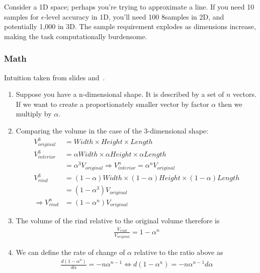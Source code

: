 \documentclass[11pt]{article}
\begin{document}
Consider a 1D space; perhaps you're trying to approximate a line. If you need 10 samples for $\epsilon$-level accuracy in 1D, you'll need 100 8samples in 2D, and potentially 1,000 in 3D. The sample requirement explodes as dimensions increase, making the task computationally burdensome.

\subsubsection{Math}

Intuition taken from slides and~\cite{stackexchangeMathematicalDemonstration}.

\begin{enumerate}
    \item Suppose you have a n-dimensional shape. It is described by a set of $n$ vectors. If we want to create a proportionately smaller vector by factor $\alpha$ then we multiply by $\alpha$.
    \item Comparing the volume in the case of the 3-dimensional shape:
          \begin{align}
              V^3_{original} & =Width\times Height\times Length                                                                     \\
              V^3_{interior} & =\alpha Width\times \alpha Height\times \alpha Length                                                \\
                             & = \alpha^3 V_{original} \Rightarrow V^n_{interior} = \alpha^n V_{original}                           \\
              V^3_{rind}     & = (1-\alpha) Width\times (1-\alpha) Height\times (1-\alpha) Length\label{equ:rind-vs-interror-alpha} \\
                             & = (1-\alpha^3) V_{original}  \\ 
              \Rightarrow V^n_{rind}  & = (1-\alpha^n) V_{original}
          \end{align}
    \item The volume of the rind relative to the original volume therefore is
          \begin{align}
              \frac{V_{rind}}{V_{original}} = 1 - \alpha^n
          \end{align}
    \item We can define the rate of change of $\alpha$ relative to the ratio above as
          \begin{align}
              \frac{d (1 - \alpha^n)}{d\alpha} = -n\alpha^{n-1} \iff d(1-\alpha^n) = -n\alpha^{n-1}d\alpha\label{eq:rate-of-growth-alpha}

\end{align}
\end{enumerate}
\end{document}
